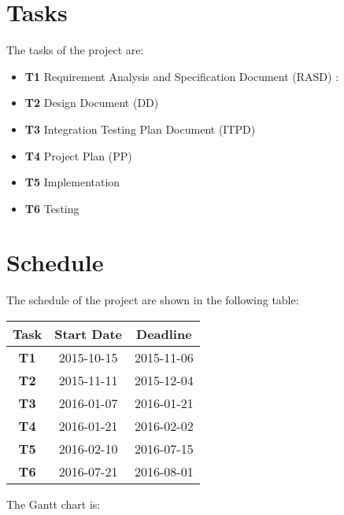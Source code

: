 \section{Tasks}
The tasks of the project are:

\begin{itemize}
	
	\item\textbf{T1} Requirement Analysis and Specification Document (RASD) : 
	
	\item\textbf{T2} Design Document (DD)
	
	\item\textbf{T3} Integration Testing Plan Document (ITPD)
	
	\item\textbf{T4} Project Plan (PP)
	
	\item\textbf{T5} Implementation
	
	\item\textbf{T6} Testing 
	
\end{itemize}



\section{Schedule}

The schedule of the project are shown in the following table:


\begin{table}[h]
	\centering
	\begin{tabular}{| c | c | c |}
		\hline
		 Task & Start Date & Deadline  \\ \hline
		\textbf{T1} & 2015-10-15  & 2015-11-06 \\ \hline
		\textbf{T2} & 2015-11-11 & 2015-12-04 \\ \hline
		\textbf{T3} & 2016-01-07 & 2016-01-21 \\ \hline
		\textbf{T4} & 2016-01-21 & 2016-02-02 \\ \hline
		\textbf{T5} & 2016-02-10 & 2016-07-15 \\ \hline
		\textbf{T6} & 2016-07-21 & 2016-08-01 \\ \hline
	\end{tabular}
\end{table}
\newpage
The Gantt chart is: 


